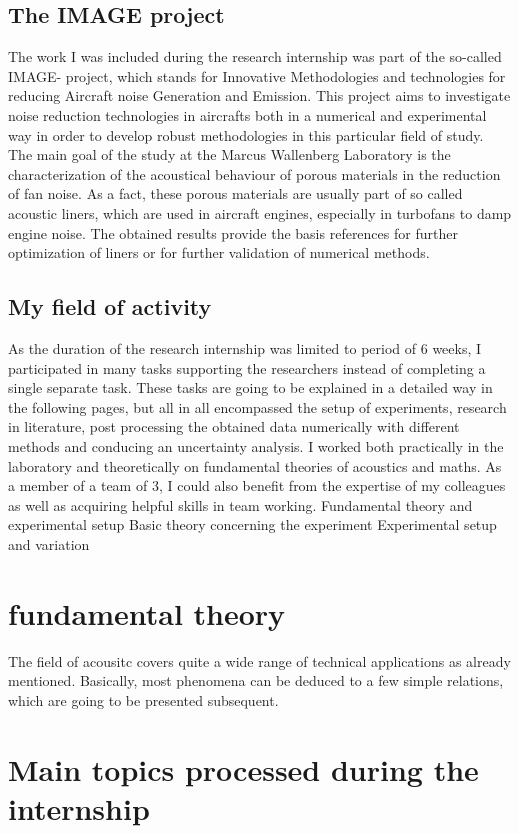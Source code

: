\documentclass{article}
\begin{document}
\subsection{The IMAGE project} 
The work I was included during the research internship was part of the so-called IMAGE- project, which stands for Innovative Methodologies and technologies for reducing Aircraft noise Generation and Emission.
This project aims to investigate noise reduction technologies in aircrafts both in a numerical and experimental way in order to develop robust methodologies in this particular field of study.  
The main goal of the study at the Marcus Wallenberg Laboratory is the characterization of the acoustical behaviour of porous materials in the reduction of fan noise.
As a fact, these porous materials are usually part of so called acoustic liners, which are used in aircraft engines, especially in turbofans to damp engine noise.
The obtained results provide the basis references for further optimization of liners or for further validation of numerical methods. 

\subsection{My field of activity} 
As the duration of the research internship was limited to period of 6 weeks, I participated in many tasks supporting the researchers instead of completing a single separate task.
These tasks are going to be explained in a detailed way in the following pages, but all in all encompassed the setup of experiments, research in literature, post processing the obtained data numerically with different methods and conducing an uncertainty analysis.
I worked both practically in the laboratory and theoretically on fundamental theories of acoustics and maths.
As a member of a team of 3, I could also benefit from the expertise of my colleagues as well as acquiring helpful skills in team working.
Fundamental theory and experimental setup
Basic theory concerning the experiment
Experimental setup and variation
\section{fundamental theory}
The field of acousitc covers quite a wide range of technical applications as already mentioned.
Basically, most phenomena can be deduced to a few simple relations, which are going to be presented subsequent. 
\section{Main topics processed during the internship}
\end{document}
